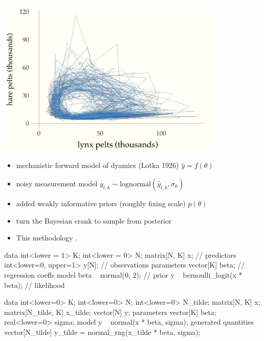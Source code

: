 \documentclass[10pt]{report}
\begin{document}
\begin{center}
\includegraphics[width=0.8\textwidth]{img/lotka-volterra-posterior-time.png}
\end{center}

\begin{itemize}
\item mechanistic forward model of dyamics (Lotka 1926) $\hat{y} = f(\theta)$
\item noisy measurement model $y_{t,k} \sim \textrm{lognormal}(\hat{y}_{t,k}, \sigma_k)$
\item added weakly informative priors (roughly fixing scale) $p(\theta)$
\item turn the Bayesian crank to sample from posterior
\item This methodology .
\end{itemize}


%
\begin{stancode}
 data {
   int<lower = 1> K;
   int<lower = 0> N;
   matrix[N, K] x;                  // predictors
   int<lower=0, upper=1> y[N];      // observations
 }
 parameters {
   vector[K] beta;                  // regression coeffs
 }
 model {
   beta ~ normal(0, 2);            // prior
   y ~ bernoulli_logit(x * beta);  // likelihood
 }
\end{stancode}

%
\begin{stancode}
data {
  int<lower=0> K;
  int<lower=0> N;           int<lower=0> N_tilde;
  matrix[N, K] x;           matrix[N_tilde, K] x_tilde;
  vector[N] y;
}
parameters {
  vector[K] beta;           real<lower=0> sigma;
}
model {
  y ~ normal(x * beta, sigma);
}
generated quantities {
  vector[N_tilde] y_tilde
    = normal_rng(x_tilde * beta, sigma);
}
\end{stancode}
\end{document}
